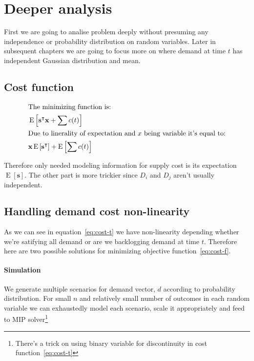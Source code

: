 
\chapter{Deeper analysis}
\label{chap:Deeper analysis}

First we are going to analise problem deeply without presuming any independence or probability distribution on random variables. Later in subsequent chapters we are going to focus more on where demand at time $t$ has independent Gaussian distribution and mean.

\section{Cost function}
\begin{align*}
\shortintertext{The minimizing function is:}
    & \operatorname{E} \left[
        \mathbf{s}^\intercal\mathbf{x} + \sum{c(t)}
    \right] \\
\shortintertext{Due to linerality of expectation and $x$ being variable it's equal to:}
    & \mathbf{x} \operatorname{E} \left[
        \mathbf{s}^\intercal
        \right] +
        \operatorname{E} \left[ \sum{c(t)} \right] \\
\end{align*}

Therefore only needed modeling information for supply cost is its expectation $\operatorname{E} \left[ \mathbf{s} \right]$. The other part is more trickier since $D_i$ and $D_j$ aren't usually independent.

\section{Handling demand cost non-linearity}
\label{sec:Handling demand cost non-linearity}

As we can see in equation~\ref{eq:cost-t} we have non-linearity depending whether we're satifying all demand or are we backlogging demand at time $t$. Therefore here are two possible solutions for minimizing objective function~\ref{eq:cost-f}.

\subsubsection{Simulation}
\label{subs:Simulation}

We generate multiple scenarios for demand vector, $d$ according to probability distribution. For small $n$ and relatively small number of outcomes in each random variable we can exhaustedly model each scenario, scale it appropriately and feed to MIP solver\footnote{There's a trick on using binary variable for discontinuity in cost function~\ref{eq:cost-t}}

